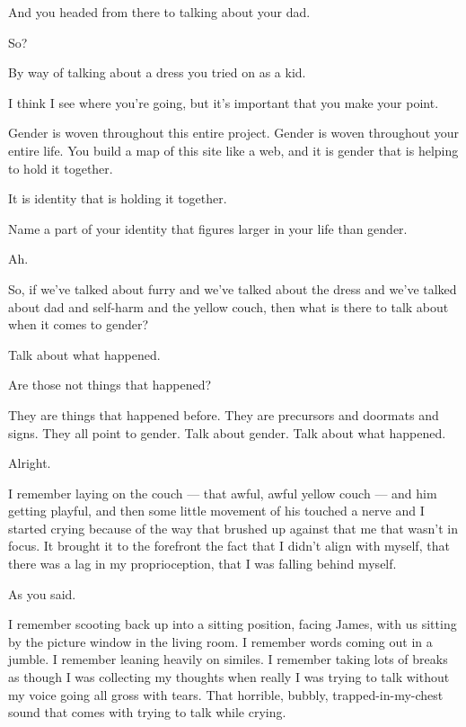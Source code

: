 \begin{paracol}{2}
\begin{leftcolumn}
\begin{ally}
And you headed from there to talking about your dad.
\end{ally}
So?

\begin{ally}
By way of talking about a dress you tried on as a kid.
\end{ally}
I think I see where you're going, but it's important that you make your point.

\begin{ally}
Gender is woven throughout this entire project. Gender is woven throughout your entire life. You build a map of this site like a web, and it is gender that is helping to hold it together.
\end{ally}
It is identity that is holding it together.

\begin{ally}
Name a part of your identity that figures larger in your life than gender.
\end{ally}
Ah.
\newpage

\noindent So, if we've talked about furry and we've talked about the dress and we've talked about dad and self-harm and the yellow couch, then what is there to talk about when it comes to gender?

\begin{ally}
Talk about what happened.
\end{ally}
Are those not things that happened?

\begin{ally}
They are things that happened before. They are precursors and doormats and signs. They all point to gender. Talk about gender. Talk about what happened.
\end{ally}
Alright.

I remember laying on the couch --- that awful, awful yellow couch --- and him getting playful, and then some little movement of his touched a nerve and I started crying because of the way that brushed up against that me that wasn't in focus. It brought it to the forefront the fact that I didn't align with myself, that there was a lag in my proprioception, that I was falling behind myself.

\begin{ally}
As you said.
\end{ally}
I remember scooting back up into a sitting position, facing James, with us sitting by the picture window in the living room. I remember words coming out in a jumble. I remember leaning heavily on similes. I remember taking lots of breaks as though I was collecting my thoughts when really I was trying to talk without my voice going all gross with tears. That horrible, bubbly, trapped-in-my-chest sound that comes with trying to talk while crying.


\end{leftcolumn}
\end{paracol}
